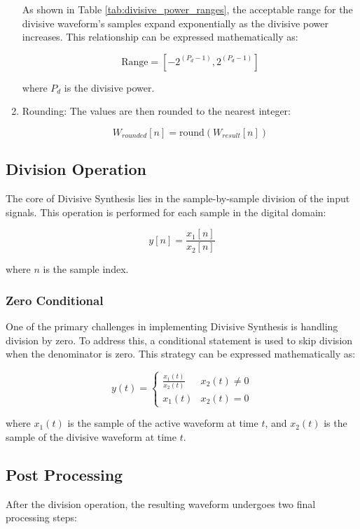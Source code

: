 \documentclass[12pt,a4paper]{article}
\begin{document}
\begin{enumerate}
As shown in Table \ref{tab:divisive_power_ranges}, the acceptable range for the divisive waveform's samples expand exponentially as the divisive power increases. This relationship can be expressed mathematically as:

\begin{equation*}
\text{Range} = [-2^{(P_d - 1)}, 2^{(P_d - 1)}]
\end{equation*}

where $P_d$ is the divisive power.

    \item Rounding: The values are then rounded to the nearest integer:
    
    \begin{equation*}
    W_{rounded}[n] = \text{round}(W_{result}[n])
    \end{equation*}
\end{enumerate}
\subsection{Division Operation}
The core of Divisive Synthesis lies in the sample-by-sample division of the input signals. This operation is performed for each sample in the digital domain:

\begin{equation*}
y[n] = \frac{x_1[n]}{x_2[n]}
\end{equation*}

where $n$ is the sample index.

\subsubsection{Zero Conditional}
One of the primary challenges in implementing Divisive Synthesis is handling division by zero. To address this, a conditional statement is used to skip division when the denominator is zero. This strategy can be expressed mathematically as:

\begin{equation*}
y(t) = \begin{cases} 
      \frac{x_1(t)}{x_2(t)} & x_2(t) \neq 0 \\
      x_1(t) & x_2(t) = 0
   \end{cases}
\end{equation*}

where $x_1(t)$ is the sample of the active waveform at time $t$, and $x_2(t)$ is the sample of the divisive waveform at time $t$.


\subsection{Post Processing}
After the division operation, the resulting waveform undergoes two final processing steps:
\end{document}
